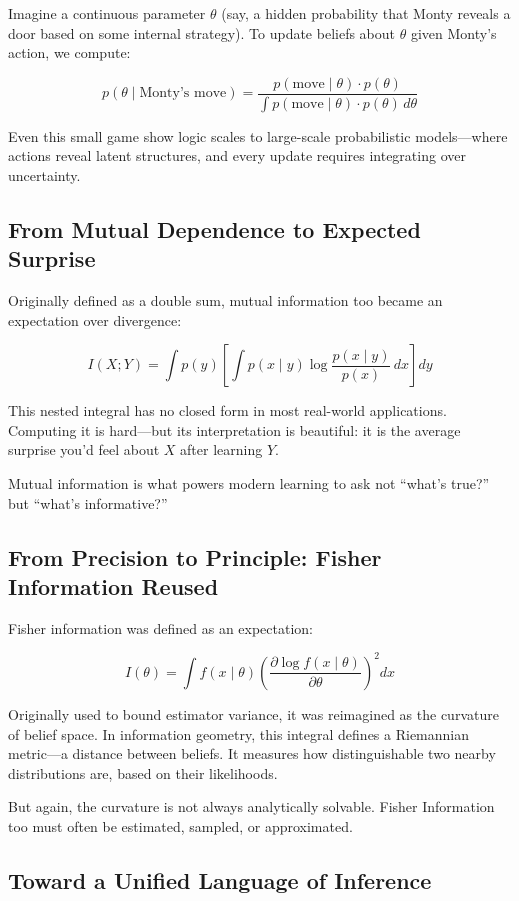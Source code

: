 Imagine a continuous parameter \( \theta \) (say, a hidden probability that Monty reveals a door based on some internal strategy). To update beliefs about \( \theta \) given Monty's action, we compute:

\[
p(\theta \mid \text{Monty's move}) = \frac{p(\text{move} \mid \theta) \cdot p(\theta)}{\int p(\text{move} \mid \theta) \cdot p(\theta) \, d\theta}
\]

Even this small game show logic scales to large-scale probabilistic models—where actions reveal latent structures, and every update requires integrating over uncertainty.

\subsection{From Mutual Dependence to Expected Surprise}

Originally defined as a double sum, mutual information too became an expectation over divergence:

\[
I(X; Y) = \int p(y) \left[ \int p(x \mid y) \log \frac{p(x \mid y)}{p(x)} \, dx \right] dy
\]

This nested integral has no closed form in most real-world applications. Computing it is hard—but its interpretation is beautiful: it is the average surprise you’d feel about \( X \) after learning \( Y \).

Mutual information is what powers modern learning to ask not “what’s true?” but “what’s informative?”

\subsection*{From Precision to Principle: Fisher Information Reused}

Fisher information was defined as an expectation:

\[
I(\theta) = \int f(x \mid \theta) \left( \frac{\partial \log f(x \mid \theta)}{\partial \theta} \right)^2 dx
\]

Originally used to bound estimator variance, it was reimagined as the curvature of belief space. In information geometry, this integral defines a Riemannian metric—a distance between beliefs. It measures how distinguishable two nearby distributions are, based on their likelihoods.

But again, the curvature is not always analytically solvable. Fisher Information too must often be estimated, sampled, or approximated.

\subsection{Toward a Unified Language of Inference}

